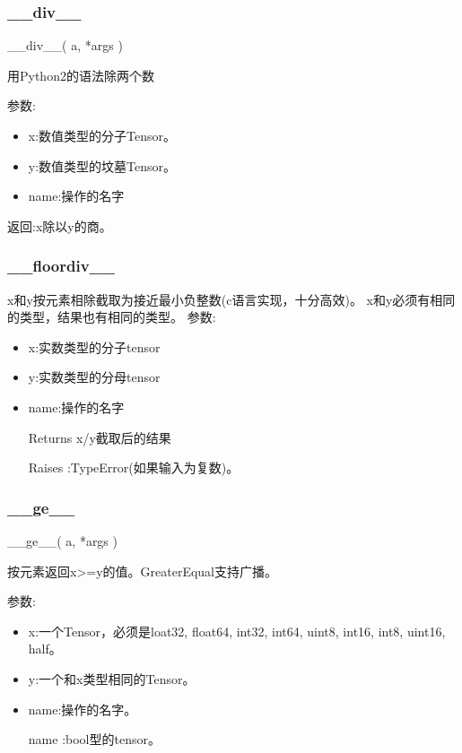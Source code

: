\subsubsection{\_\_div\_\_}
\begin{python}
__div__(
    a,
    *args
)
\end{python}
用Python2的语法除两个数

参数:
\begin{itemize}
	\item x:数值类型的分子Tensor。
	\item y:数值类型的坟墓Tensor。
	\item name:操作的名字
\end{itemize}
返回:x除以y的商。
\subsubsection{\_\_floordiv\_\_}
x和y按元素相除截取为接近最小负整数(c语言实现，十分高效)。
x和y必须有相同的类型，结果也有相同的类型。
参数:
\begin{itemize}
	\item x:实数类型的分子tensor
	\item y:实数类型的分母tensor
	\item name:操作的名字
	\item[Returns]x/y截取后的结果
	\item[Raises]:TypeError(如果输入为复数)。
\end{itemize}
\subsubsection{\_\_ge\_\_}
\begin{python}
__ge__(
    a,
    *args
)
\end{python}
按元素返回x>=y的值。GreaterEqual支持广播。

参数:
\begin{itemize}
	\item x:一个Tensor，必须是loat32, float64, int32, int64, uint8, int16, int8, uint16, half。
	\item y:一个和x类型相同的Tensor。
	\item name:操作的名字。
	\item[name]:bool型的tensor。
\end{itemize}
